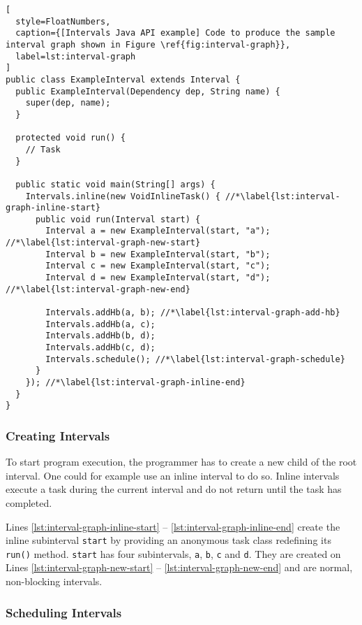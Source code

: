 \begin{lstlisting}[
  style=FloatNumbers, 
  caption={[Intervals Java API example] Code to produce the sample interval graph shown in Figure \ref{fig:interval-graph}},
  label=lst:interval-graph
]
public class ExampleInterval extends Interval {
  public ExampleInterval(Dependency dep, String name) {
    super(dep, name);
  }
  
  protected void run() {
    // Task
  }
  
  public static void main(String[] args) {
    Intervals.inline(new VoidInlineTask() { //*\label{lst:interval-graph-inline-start}
      public void run(Interval start) {
        Interval a = new ExampleInterval(start, "a"); //*\label{lst:interval-graph-new-start}
        Interval b = new ExampleInterval(start, "b");
        Interval c = new ExampleInterval(start, "c");
        Interval d = new ExampleInterval(start, "d"); //*\label{lst:interval-graph-new-end}
        
        Intervals.addHb(a, b); //*\label{lst:interval-graph-add-hb}
        Intervals.addHb(a, c);
        Intervals.addHb(b, d);
        Intervals.addHb(c, d);
        Intervals.schedule(); //*\label{lst:interval-graph-schedule}
      }
    }); //*\label{lst:interval-graph-inline-end}
  }
}
\end{lstlisting}

\subsubsection{Creating Intervals}
\label{sec:intro-intervals-creating-intervals}

To start program execution, the programmer has to create a new child
of the root interval. One could for example use an inline interval to
do so. Inline intervals execute a task during the current interval and
do not return until the task has completed.

Lines \ref{lst:interval-graph-inline-start} --
\ref{lst:interval-graph-inline-end} create the inline subinterval
\lstinline|start| by providing an anonymous task class redefining its
\lstinline|run()| method. \lstinline|start| has four subintervals,
\lstinline|a|, \lstinline|b|, \lstinline|c| and \lstinline|d|. They
are created on Lines \ref{lst:interval-graph-new-start} --
\ref{lst:interval-graph-new-end} and are normal, non-blocking
intervals.

\subsubsection{Scheduling Intervals}
\label{sec:intro-intervals-scheduling-intervals}

